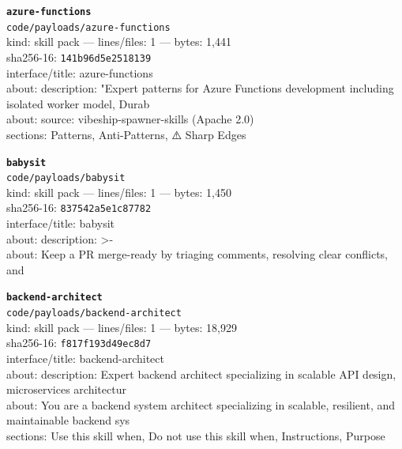 \noindent\textbf{\texttt{azure-functions}}\\
\texttt{code/payloads/azure-functions}\\
kind: skill pack --- lines/files: 1 --- bytes: 1,441\\
sha256-16: \texttt{141b96d5e2518139}\\
interface/title: azure-functions\\
about: description: "Expert patterns for Azure Functions development including isolated worker model, Durab\\
about: source: vibeship-spawner-skills (Apache 2.0)\\
sections: Patterns, Anti-Patterns, ⚠️ Sharp Edges\\
\vspace*{6.0pt}

\noindent\textbf{\texttt{babysit}}\\
\texttt{code/payloads/babysit}\\
kind: skill pack --- lines/files: 1 --- bytes: 1,450\\
sha256-16: \texttt{837542a5e1c87782}\\
interface/title: babysit\\
about: description: >-\\
about: Keep a PR merge-ready by triaging comments, resolving clear conflicts, and\\
\vspace*{6.0pt}

\noindent\textbf{\texttt{backend-architect}}\\
\texttt{code/payloads/backend-architect}\\
kind: skill pack --- lines/files: 1 --- bytes: 18,929\\
sha256-16: \texttt{f817f193d49ec8d7}\\
interface/title: backend-architect\\
about: description: Expert backend architect specializing in scalable API design, microservices architectur\\
about: You are a backend system architect specializing in scalable, resilient, and maintainable backend sys\\
sections: Use this skill when, Do not use this skill when, Instructions, Purpose\\
\vspace*{6.0pt}

